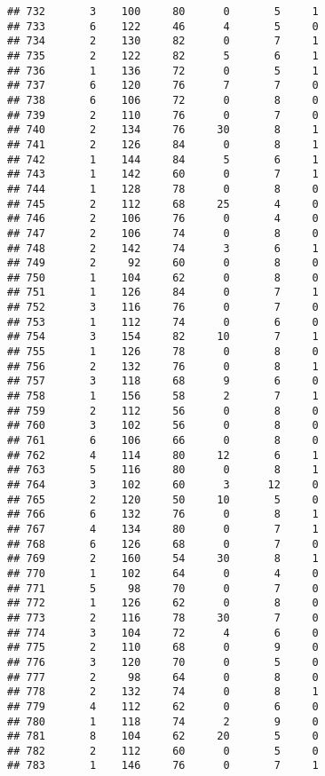 \documentclass[
]{article}
\begin{document}
\begin{verbatim}
## 732       3    100     80      0       5     1
## 733       6    122     46      4       5     0
## 734       2    130     82      0       7     1
## 735       2    122     82      5       6     1
## 736       1    136     72      0       5     1
## 737       6    120     76      7       7     0
## 738       6    106     72      0       8     0
## 739       2    110     76      0       7     0
## 740       2    134     76     30       8     1
## 741       2    126     84      0       8     1
## 742       1    144     84      5       6     1
## 743       1    142     60      0       7     1
## 744       1    128     78      0       8     0
## 745       2    112     68     25       4     0
## 746       2    106     76      0       4     0
## 747       2    106     74      0       8     0
## 748       2    142     74      3       6     1
## 749       2     92     60      0       8     0
## 750       1    104     62      0       8     0
## 751       1    126     84      0       7     1
## 752       3    116     76      0       7     0
## 753       1    112     74      0       6     0
## 754       3    154     82     10       7     1
## 755       1    126     78      0       8     0
## 756       2    132     76      0       8     1
## 757       3    118     68      9       6     0
## 758       1    156     58      2       7     1
## 759       2    112     56      0       8     0
## 760       3    102     56      0       8     0
## 761       6    106     66      0       8     0
## 762       4    114     80     12       6     1
## 763       5    116     80      0       8     1
## 764       3    102     60      3      12     0
## 765       2    120     50     10       5     0
## 766       6    132     76      0       8     1
## 767       4    134     80      0       7     1
## 768       6    126     68      0       7     0
## 769       2    160     54     30       8     1
## 770       1    102     64      0       4     0
## 771       5     98     70      0       7     0
## 772       1    126     62      0       8     0
## 773       2    116     78     30       7     0
## 774       3    104     72      4       6     0
## 775       2    110     68      0       9     0
## 776       3    120     70      0       5     0
## 777       2     98     64      0       8     0
## 778       2    132     74      0       8     1
## 779       4    112     62      0       6     0
## 780       1    118     74      2       9     0
## 781       8    104     62     20       5     0
## 782       2    112     60      0       5     0
## 783       1    146     76      0       7     1

\end{verbatim}
\end{document}
